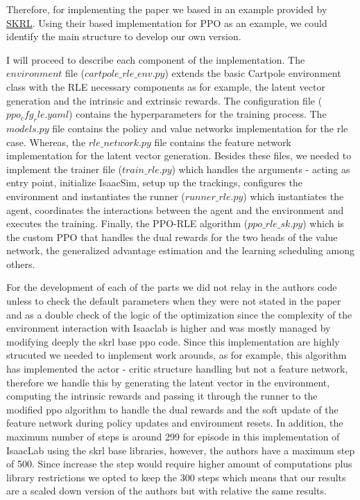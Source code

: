 \documentclass{article}  %
\begin{document}
Therefore, for implementing the paper we based in an example provided by \href{https://skrl.readthedocs.io/en/latest/#}{SKRL}.
Using their based implementation for PPO as an example, we could identify the main structure to develop our own version. 

I will proceed to describe each component of the implementation. The $environment$ file ($cartpole\_rle\_env.py$) extends the basic Cartpole environment class with the RLE necessary components as for example, 
the latent vector generation and the intrinsic and extrinsic rewards. The configuration file ($ppo_cfg_rle.yaml$) contains the hyperparameters for the training process. The $models.py$ file contains the policy and value networks
implementation for the rle case. Whereas, the $rle\_network.py$ file contains the feature network implementation for the latent vector generation. 
Besides these files, we needed to implement the trainer file ($train\_rle.py$) which handles the arguments - acting as entry point, initialize IsaacSim, setup up the trackings, configures the environment and 
instantiates the runner ($runner\_rle.py$) which instantiates the agent, coordinates the interactions between the agent and the environment and executes the training. Finally, the PPO-RLE algorithm ($ppo\_rle\_sk.py$)
which is the custom PPO that handles the dual rewards for the two heads of the value network, the generalized advantage estimation and the learning scheduling among others. 

For the development of each of the parts we did not relay in the authors code unless to check the default parameters when they were not stated in the paper and as a double check of the logic of the optimization since the 
complexity of the environment interaction with Isaaclab is higher and was mostly managed by modifying deeply the skrl base ppo code. Since this implementation are highly strucuted we needed to implement work arounds, as for example,
this algorithm has implemented the actor - critic structure handling but not a feature network, therefore we handle this by generating the latent vector in the environment, computing the intrinsic rewards and passing it through the runner 
to the modified ppo algorithm to handle the dual rewards and the soft update of the feature network during policy updates and environment resets. In addition, the maximum number of steps is around 299 for episode in this implementation of
IsaacLab using the skrl base libraries, however, the authors have a maximum step of 500. Since increase the step would require higher amount of computations plus library restrictions we opted to keep the 300 steps which means that our results are
a scaled down version of the authors but with relative the same results. 
\end{document}
